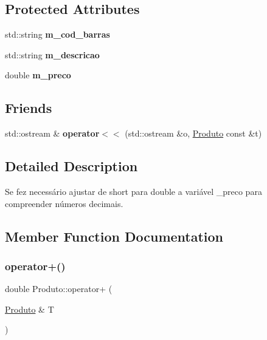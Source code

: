 \subsection*{Protected Attributes}
\begin{DoxyCompactItemize}
\item 
\mbox{\label{classProduto_a2e772f6b851f2a2c7d7bc6853af7ca83}} 
std\+::string {\bfseries m\+\_\+cod\+\_\+barras}
\item 
\mbox{\label{classProduto_aacf69c2cf01b6040138767a47c1e3f4b}} 
std\+::string {\bfseries m\+\_\+descricao}
\item 
\mbox{\label{classProduto_af4f68aad97167802a1dca2b8ddb188eb}} 
double {\bfseries m\+\_\+preco}
\end{DoxyCompactItemize}
\subsection*{Friends}
\begin{DoxyCompactItemize}
\item 
\mbox{\label{classProduto_a75e56b3684b7859fc15d147b7d27f6b0}} 
std\+::ostream \& {\bfseries operator$<$$<$} (std\+::ostream \&o, \mbox{\hyperlink{classProduto}{Produto}} const \&t)
\end{DoxyCompactItemize}


\subsection{Detailed Description}
Se fez necessário ajustar de short para double a variável \+\_\+preco para compreender números decimais. 

\subsection{Member Function Documentation}
\mbox{\label{classProduto_a4b1186b555e78a10bc43dceceb2fde23}} 
\subsubsection{\texorpdfstring{operator+()}{operator+()}}
{\footnotesize\ttfamily double Produto\+::operator+ (\begin{DoxyParamCaption}\item[{\mbox{\hyperlink{classProduto}{Produto}} \&}]{T }\end{DoxyParamCaption})}


